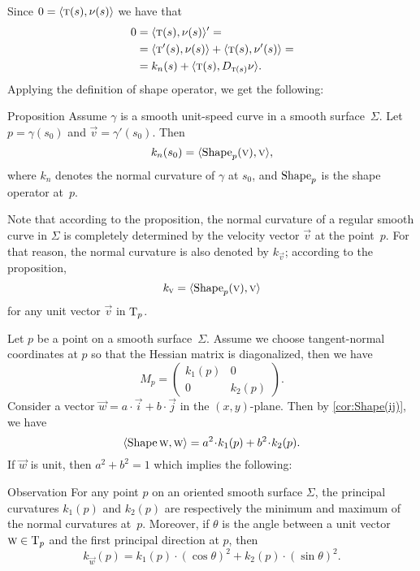 Since $0=\langle \text{\sc{t}}(s),\nu(s)\rangle$ we have 
that 
\begin{align*}
0&=\langle \text{\sc{t}}(s),\nu(s)\rangle'=
\\
&=\langle \text{\sc{t}}'(s),\nu(s)\rangle+\langle \text{\sc{t}}(s),\nu'(s)\rangle=
\\
&=k_n(s)+\langle \text{\sc{t}}(s),D_{\text{\sc{t}}(s)}\nu\rangle.
\end{align*}
Applying the definition of shape operator,
we get the following:

\begin{thm}{Proposition}\label{prop:normal-shape}
Assume $\gamma$ is a smooth unit-speed curve in a smooth surface~$\Sigma$.
Let $p=\gamma(s_0)$ and $\vec v=\gamma'(s_0)$.
Then 
\[k_n(s_0)=\langle \mathop{\rm Shape}\nolimits_p(\text{\sc{v}}),\text{\sc{v}}\rangle,\]
where $k_n$ denotes the normal curvature of $\gamma$ at $s_0$, and $\mathop{\rm Shape}\nolimits_p$ is the shape operator at~$p$.
\end{thm}

Note that according to the proposition, the normal curvature of a regular smooth curve in $\Sigma$ is completely determined by the velocity vector $\vec v$ at the point~$p$.
For that reason, the normal curvature is also denoted by $k_{\vec v}$;
according to the proposition,
\[k_{\text{\sc{v}}}=\langle \mathop{\rm Shape}\nolimits_p(\text{\sc{v}}),\text{\sc{v}}\rangle\]
for any unit vector $\vec v$ in $\mathrm{T}_p$.

Let $p$ be a point on a smooth surface~$\Sigma$.
Assume we choose tangent-normal coordinates at $p$ so that the Hessian matrix is diagonalized, then we have
\[M_p=\begin{pmatrix}
 k_1(p)
 &0
 \\
 0
 &k_2(p)
 \end{pmatrix}.
\]
Consider a vector ${\vec w}=a\cdot\vec i+b\cdot\vec j$ in the $(x,y)$-plane.
Then by \ref{cor:Shape(ij)}, we have
\[
\langle \Shape\vec w,\vec w\rangle
=a^2\cdot k_1(p) +b^2\cdot k_2(p). 
\]
If ${\vec w}$ is unit, then $a^2+b^2=1$ which implies the following:

\begin{thm}{Observation}\label{obs:k1-k2}
For any point $p$ on an oriented smooth surface $\Sigma$,
the principal curvatures $k_1(p)$ and $k_2(p)$ are respectively the minimum and maximum of the normal curvatures at~$p$.
Moreover, if $\theta$ is the angle between a unit vector ${\text{\sc{w}}}\in\mathrm{T}_p$ and the first principal direction at $p$, then 
\[k_{\vec w}(p)=k_1(p)\cdot(\cos\theta)^2+k_2(p)\cdot(\sin\theta)^2.\]

\end{thm}

